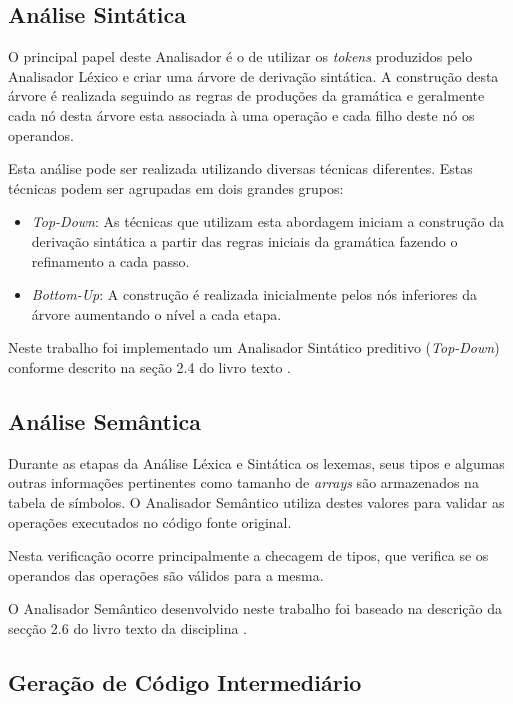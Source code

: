 \documentclass[12pt]{article}
\begin{document}
\subsection{Análise Sintática}

O principal papel deste Analisador é o de utilizar os \textit{tokens} produzidos pelo Analisador Léxico e criar uma árvore de derivação sintática. A construção desta árvore é realizada seguindo as regras de produções da gramática e geralmente cada nó desta árvore esta associada à uma operação e cada filho deste nó os operandos.

Esta análise pode ser realizada utilizando diversas técnicas diferentes. Estas técnicas podem ser agrupadas em dois grandes grupos:

\begin{itemize}
\item \textit{Top-Down}: As técnicas que utilizam esta abordagem iniciam a construção da derivação sintática a partir das regras iniciais da gramática fazendo o refinamento a cada passo.

\item \textit{Bottom-Up}: A construção é realizada inicialmente pelos nós inferiores da árvore aumentando o nível a cada etapa.
\end{itemize}

Neste trabalho foi implementado um Analisador Sintático preditivo (\textit{Top-Down}) conforme descrito na seção 2.4 do livro texto \cite{Aho:2006:CPT:1177220}.

\subsection{Análise Semântica}

Durante as etapas da Análise Léxica e Sintática os lexemas, seus tipos e algumas outras informações pertinentes como tamanho de \textit{arrays} são armazenados na tabela de símbolos. O Analisador Semântico utiliza destes valores para validar as operações executados no código fonte original.

Nesta verificação ocorre principalmente a checagem de tipos, que verifica se os operandos das operações são válidos para a mesma.

O Analisador Semântico desenvolvido neste trabalho foi baseado na descrição da secção 2.6 do livro texto da disciplina \cite{Aho:2006:CPT:1177220}.

\subsection{Geração de Código Intermediário}
\end{document}
